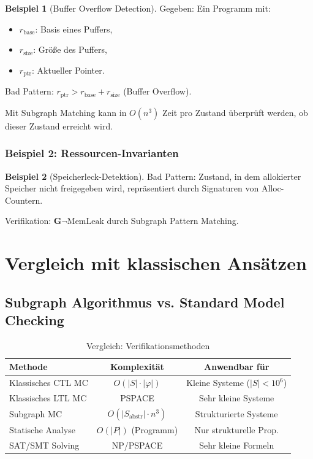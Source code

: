 \documentclass[a4paper,12pt]{article}
\theoremstyle{definition}
\newtheorem{beispiel}{Beispiel}
\begin{document}
\begin{beispiel}[Buffer Overflow Detection]
	Gegeben: Ein Programm mit:
	\begin{itemize}
		\item $r_{\text{base}}$: Basis eines Puffers,
		\item $r_{\text{size}}$: Größe des Puffers,
		\item $r_{\text{ptr}}$: Aktueller Pointer.
	\end{itemize}
	
	Bad Pattern: $r_{\text{ptr}} > r_{\text{base}} + r_{\text{size}}$ (Buffer Overflow).
	
	Mit Subgraph Matching kann in $O(n^3)$ Zeit pro Zustand überprüft werden, ob dieser Zustand erreicht wird.
\end{beispiel}

\subsubsection{Beispiel 2: Ressourcen-Invarianten}

\begin{beispiel}[Speicherleck-Detektion]
	Bad Pattern: Zustand, in dem allokierter Speicher nicht freigegeben wird, repräsentiert durch Signaturen von Alloc-Countern.
	
	Verifikation: $\mathbf{G}\neg\text{MemLeak}$ durch Subgraph Pattern Matching.
\end{beispiel}

\section{Vergleich mit klassischen Ansätzen}
\label{sec:vergleich_klassisch}

\subsection{Subgraph Algorithmus vs. Standard Model Checking}

\begin{table}[H]
	\centering
	\begin{tabular}{l|cc}
		\toprule
		\textbf{Methode} & \textbf{Komplexität} & \textbf{Anwendbar für} \\
		\midrule
		Klassisches CTL MC & $O(|S| \cdot |\varphi|)$ & Kleine Systeme ($|S| < 10^6$) \\
		Klassisches LTL MC & PSPACE & Sehr kleine Systeme \\
		Subgraph MC & $O(|S_{\text{abstr}}| \cdot n^3)$ & Strukturierte Systeme \\
		Statische Analyse & $O(|P|)$ (Programm) & Nur strukturelle Prop. \\
		SAT/SMT Solving & NP/PSPACE & Sehr kleine Formeln \\
		\bottomrule
	\end{tabular}
	\caption{Vergleich: Verifikationsmethoden}
	\label{tab:verification_comparison}
\end{table}
\end{document}
